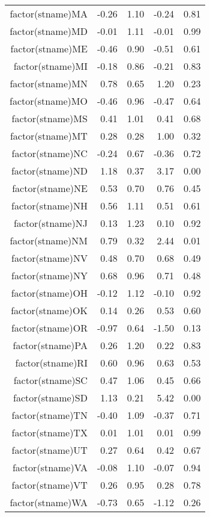 \begin{table}[ht]
\begin{tabular}{rrrrr}
  factor(stname)MA & -0.26 & 1.10 & -0.24 & 0.81 \\ 
  factor(stname)MD & -0.01 & 1.11 & -0.01 & 0.99 \\ 
  factor(stname)ME & -0.46 & 0.90 & -0.51 & 0.61 \\ 
  factor(stname)MI & -0.18 & 0.86 & -0.21 & 0.83 \\ 
  factor(stname)MN & 0.78 & 0.65 & 1.20 & 0.23 \\ 
  factor(stname)MO & -0.46 & 0.96 & -0.47 & 0.64 \\ 
  factor(stname)MS & 0.41 & 1.01 & 0.41 & 0.68 \\ 
  factor(stname)MT & 0.28 & 0.28 & 1.00 & 0.32 \\ 
  factor(stname)NC & -0.24 & 0.67 & -0.36 & 0.72 \\ 
  factor(stname)ND & 1.18 & 0.37 & 3.17 & 0.00 \\ 
  factor(stname)NE & 0.53 & 0.70 & 0.76 & 0.45 \\ 
  factor(stname)NH & 0.56 & 1.11 & 0.51 & 0.61 \\ 
  factor(stname)NJ & 0.13 & 1.23 & 0.10 & 0.92 \\ 
  factor(stname)NM & 0.79 & 0.32 & 2.44 & 0.01 \\ 
  factor(stname)NV & 0.48 & 0.70 & 0.68 & 0.49 \\ 
  factor(stname)NY & 0.68 & 0.96 & 0.71 & 0.48 \\ 
  factor(stname)OH & -0.12 & 1.12 & -0.10 & 0.92 \\ 
  factor(stname)OK & 0.14 & 0.26 & 0.53 & 0.60 \\ 
  factor(stname)OR & -0.97 & 0.64 & -1.50 & 0.13 \\ 
  factor(stname)PA & 0.26 & 1.20 & 0.22 & 0.83 \\ 
  factor(stname)RI & 0.60 & 0.96 & 0.63 & 0.53 \\ 
  factor(stname)SC & 0.47 & 1.06 & 0.45 & 0.66 \\ 
  factor(stname)SD & 1.13 & 0.21 & 5.42 & 0.00 \\ 
  factor(stname)TN & -0.40 & 1.09 & -0.37 & 0.71 \\ 
  factor(stname)TX & 0.01 & 1.01 & 0.01 & 0.99 \\ 
  factor(stname)UT & 0.27 & 0.64 & 0.42 & 0.67 \\ 
  factor(stname)VA & -0.08 & 1.10 & -0.07 & 0.94 \\ 
  factor(stname)VT & 0.26 & 0.95 & 0.28 & 0.78 \\ 
  factor(stname)WA & -0.73 & 0.65 & -1.12 & 0.26 \\ 

\end{tabular}
\end{table}
